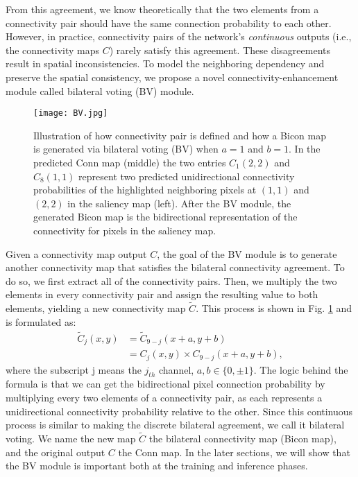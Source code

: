 \documentclass[review]{cvpr}
\begin{document}
From this agreement, we know theoretically that the two elements from a connectivity pair should have the same connection probability to each other. However, in practice, connectivity pairs of the network’s \textit{continuous} outputs (i.e., the connectivity maps $C$) rarely satisfy this agreement. These disagreements result in spatial inconsistencies. To model the neighboring dependency and preserve the spatial consistency, we propose a novel connectivity-enhancement module called bilateral voting (BV) module.

\begin{figure}[h!]
\begin{center}
   \texttt{[image: BV.jpg]}
\end{center}
\vspace{-20pt}
\caption{Illustration of how connectivity pair is defined and how a Bicon map is generated via bilateral voting (BV) when $a = 1$ and $b = 1$. In the predicted Conn map (middle) the two entries $C_1(2,2)$ and $C_8(1,1)$ represent two predicted unidirectional connectivity probabilities of the highlighted neighboring pixels at $(1,1)$ and $(2,2)$ in the saliency map (left). After the BV module, the generated Bicon map is the bidirectional representation of the connectivity for pixels in the saliency map. }
\label{bv}
\vspace{-10pt}
\end{figure}

Given a connectivity map output $C$, the goal of the BV module is to generate another connectivity map that satisfies the bilateral connectivity agreement. To do so, we first extract all of the connectivity pairs. Then, we multiply the two elements in every connectivity pair and assign the resulting value to both elements, yielding a new connectivity map $\widetilde {C}$. This process is shown in Fig. \ref{bv} and is formulated as: 		
\begin{equation}
\begin{split}
{\widetilde C_j}(x,y) &= {\widetilde C_{9 - j}}(x + a,y + b) \\
&= {C_j}(x,y) \times {C_{9 - j}}(x + a,y + b),
\end{split}
\end{equation}
where the subscript j means the $j_{th}$ channel, $a,b \in \{ 0, \pm 1\}$. The logic behind the formula is that we can get the bidirectional pixel connection probability by multiplying every two elements of a connectivity pair, as each represents a unidirectional connectivity probability relative to the other. Since this continuous process is similar to making the discrete bilateral agreement, we call it bilateral voting. We name the new map $\widetilde {C}$ the bilateral connectivity map (Bicon map), and the original output $C$ the Conn map. In the later sections, we will show that the BV module is important both at the training and inference phases. 
\end{document}

